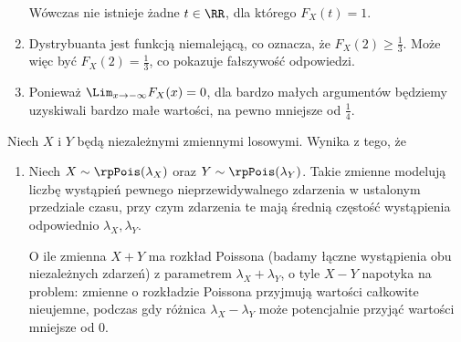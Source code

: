 \begin{solutions}
\begin{enumerate}[\bf A.]
\begin{center}
        \end{center}

        Wówczas nie istnieje żadne $t \in \RR$, dla którego $F_X(t) = 1$.

        \item Dystrybuanta jest funkcją niemalejącą, co oznacza, że $F_X(2) \geq \frac{1}{3}$. Może więc być $F_X(2) = \frac{1}{3}$, co pokazuje fałszywość odpowiedzi.

        \item Ponieważ $\Lim_{x \to -\infty} F_X(x) = 0$, dla bardzo małych argumentów będziemy uzyskiwali bardzo małe wartości, na pewno mniejsze od $\frac{1}{4}$.
    \end{enumerate}

    \sol Niech $X$ i $Y$ będą niezależnymi zmiennymi losowymi. Wynika z tego, że

    \begin{enumerate}[\bf A.]
        \item Niech $X \sim \rpPois(\lambda_X)$ oraz $Y \sim \rpPois(\lambda_Y)$. Takie zmienne modelują liczbę wystąpień pewnego nieprzewidywalnego zdarzenia w ustalonym przedziale czasu, przy czym zdarzenia te mają średnią częstość wystąpienia odpowiednio $\lambda_X, \lambda_Y$.

        O ile zmienna $X + Y$ ma rozkład Poissona (badamy łączne wystąpienia obu niezależnych zdarzeń) z parametrem $\lambda_X + \lambda_Y$, o tyle $X - Y$ napotyka na problem: zmienne o rozkładzie Poissona przyjmują wartości całkowite nieujemne, podczas gdy różnica $\lambda_X - \lambda_Y$ może potencjalnie przyjąć wartości mniejsze od 0.


\end{enumerate}
\end{solutions}

